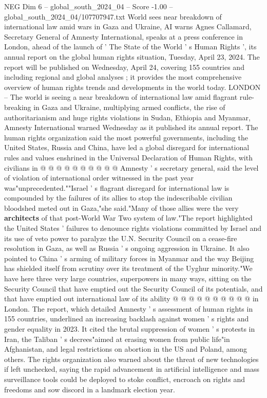 \begin{textsample}{NEG Dim 6 – global\_south\_2024\_04 – Score -1.00 – global\_south\_2024\_04/107707947.txt}  \label{ex:f6_neg_356}
World sees near breakdown of international law amid wars in Gaza and Ukraine, AI warns Agnes Callamard, Secretary General of Amnesty International, speaks at a press conference in London, ahead of the launch of ' The State of the World ' s Human Rights ', its annual report on the global human rights situation, Tuesday, April 23, 2024.
The report will be published on Wednesday, April 24, covering 155 countries and including regional and global analyses ; it provides the most comprehensive overview of human rights trends and developments in the world today.
LONDON -- The world is seeing a near breakdown of international law amid flagrant rule-breaking in Gaza and Ukraine, multiplying armed conflicts, the rise of authoritarianism and huge rights violations in Sudan, Ethiopia and Myanmar, Amnesty International warned Wednesday as it published its annual report.
The human rights organization said the most powerful governments, including the United States, Russia and China, have led a global disregard for international rules and values enshrined in the Universal Declaration of Human Rights, with civilians in @ @ @ @ @ @ @ @ @ @ Amnesty ' s secretary general, said the level of violation of international order witnessed in the past year was"unprecedented.""Israel ' s flagrant disregard for international law is compounded by the failures of its allies to stop the indescribable civilian bloodshed meted out in Gaza,"she said."Many of those allies were the very \textbf{architects} of that post-World War Two system of law."The report highlighted the United States ' failures to denounce rights violations committed by Israel and its use of veto power to paralyze the U.N.
Security Council on a cease-fire resolution in Gaza, as well as Russia ' s ongoing aggression in Ukraine.
It also pointed to China ' s arming of military forces in Myanmar and the way Beijing has shielded itself from scrutiny over its treatment of the Uyghur minority."We have here three very large countries, superpowers in many ways, sitting on the Security Council that have emptied out the Security Council of its potentials, and that have emptied out international law of its ability @ @ @ @ @ @ @ @ @ @ in London.
The report, which detailed Amnesty ' s assessment of human rights in 155 countries, underlined an increasing backlash against women ' s rights and gender equality in 2023.
It cited the brutal suppression of women ' s protests in Iran, the Taliban ' s decrees"aimed at erasing women from public life"in Afghanistan, and legal restrictions on abortion in the US and Poland, among others.
The rights organization also warned about the threat of new technologies if left unchecked, saying the rapid advancement in artificial intelligence and mass surveillance tools could be deployed to stoke conflict, encroach on rights and freedoms and sow discord in a landmark election year.

\end{textsample}
